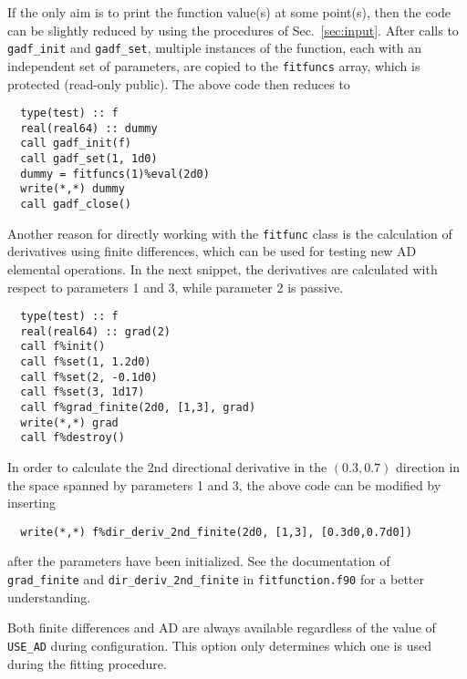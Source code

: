 \documentclass{article}
\begin{document}
If the only aim is to print the function value(s) at some point(s), then the code can be slightly reduced by using the procedures of Sec.~\ref{sec:input}. After calls to \verb+gadf_init+ and \verb+gadf_set+, multiple instances of the function, each with an independent set of parameters, are copied to the \verb+fitfuncs+ array, which is protected (read-only public). The above code then reduces to
\begin{verbatim}
  type(test) :: f
  real(real64) :: dummy
  call gadf_init(f)
  call gadf_set(1, 1d0)
  dummy = fitfuncs(1)%eval(2d0)
  write(*,*) dummy
  call gadf_close()
\end{verbatim}
Another reason for directly working with the \verb+fitfunc+ class is the calculation of derivatives using finite differences, which can be used for testing new AD elemental operations. In the next snippet, the derivatives are calculated with respect to parameters 1 and 3, while parameter 2 is passive.
\begin{verbatim}
  type(test) :: f
  real(real64) :: grad(2)
  call f%init()
  call f%set(1, 1.2d0)         
  call f%set(2, -0.1d0)
  call f%set(3, 1d17)
  call f%grad_finite(2d0, [1,3], grad)
  write(*,*) grad
  call f%destroy()
\end{verbatim}
In order to calculate the 2nd directional derivative in the $(0.3,0.7)$ direction in the space spanned by parameters 1 and 3, the above code can be modified by inserting
\begin{verbatim}
  write(*,*) f%dir_deriv_2nd_finite(2d0, [1,3], [0.3d0,0.7d0])
\end{verbatim}
after the parameters have been initialized. See the documentation of \\
\verb+grad_finite+ and \verb+dir_deriv_2nd_finite+ in \verb+fitfunction.f90+ for a better understanding.

Both finite differences and AD are always available regardless of the value of \verb+USE_AD+ during configuration. This option only determines which one is used during the fitting procedure.
\end{document}
